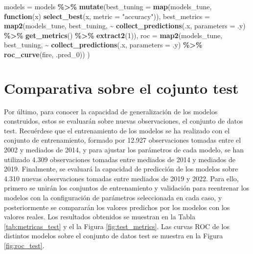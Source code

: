\documentclass[12pt,a4paper,]{book}
\newenvironment{Shaded}{\begin{snugshade}}{\end{snugshade}}
\newcommand{\AttributeTok}[1]{\textcolor[rgb]{0.13,0.29,0.53}{#1}}
\newcommand{\ControlFlowTok}[1]{\textcolor[rgb]{0.13,0.29,0.53}{\textbf{#1}}}
\newcommand{\DecValTok}[1]{\textcolor[rgb]{0.00,0.00,0.81}{#1}}
\newcommand{\FunctionTok}[1]{\textcolor[rgb]{0.13,0.29,0.53}{\textbf{#1}}}
\newcommand{\NormalTok}[1]{#1}
\newcommand{\OtherTok}[1]{\textcolor[rgb]{0.56,0.35,0.01}{#1}}
\newcommand{\SpecialCharTok}[1]{\textcolor[rgb]{0.81,0.36,0.00}{\textbf{#1}}}
\newcommand{\StringTok}[1]{\textcolor[rgb]{0.31,0.60,0.02}{#1}}
\numberwithin{dummy}{section}
\theoremstyle{ocrenumbox}
\theoremstyle{blacknumex}
\theoremstyle{blacknumbox}
\theoremstyle{ocrenum}
\theoremstyle{ocrenum}
\begin{document}
\begin{Shaded}
\begin{Highlighting}[]
\NormalTok{models }\OtherTok{=}\NormalTok{ models }\SpecialCharTok{\%\textgreater{}\%} 
  \FunctionTok{mutate}\NormalTok{(}\AttributeTok{best\_tuning =} \FunctionTok{map}\NormalTok{(models\_tune, }
                           \ControlFlowTok{function}\NormalTok{(x) }\FunctionTok{select\_best}\NormalTok{(x, }
                                                   \AttributeTok{metric =} \StringTok{"accuracy"}\NormalTok{)),}
         \AttributeTok{best\_metrics =} \FunctionTok{map2}\NormalTok{(models\_tune,}
\NormalTok{                             best\_tuning,       }
                             \SpecialCharTok{\textasciitilde{}} \FunctionTok{collect\_predictions}\NormalTok{(.x,}
                                                   \AttributeTok{parameters =}\NormalTok{ .y) }\SpecialCharTok{\%\textgreater{}\%}    
                               \FunctionTok{get\_metrics}\NormalTok{() }\SpecialCharTok{\%\textgreater{}\%}          
                               \FunctionTok{extract2}\NormalTok{(}\DecValTok{1}\NormalTok{)), }
         \AttributeTok{roc =} \FunctionTok{map2}\NormalTok{(models\_tune,}
\NormalTok{                    best\_tuning,}
                    \SpecialCharTok{\textasciitilde{}} \FunctionTok{collect\_predictions}\NormalTok{(.x,}
                                          \AttributeTok{parameters =}\NormalTok{ .y) }\SpecialCharTok{\%\textgreater{}\%}    
                      \FunctionTok{roc\_curve}\NormalTok{(fire, .pred\_0))}
\NormalTok{         ) }
\end{Highlighting}
\end{Shaded}

\hypertarget{comparativa-sobre-el-cojunto-test}{%
\section{Comparativa sobre el cojunto
test}\label{comparativa-sobre-el-cojunto-test}}

Por último, para conocer la capacidad de generalización de los modelos
construidos, estos se evaluarán sobre nuevas observaciones, el conjunto
de datos test. Recuérdese que el entrenamiento de los modelos se ha
realizado con el conjunto de entrenamiento, formado por 12.927
observaciones tomadas entre el 2002 y mediados de 2014, y para ajustar
los parámetros de cada modelo, se han utilizado 4.309 observaciones
tomadas entre mediados de 2014 y mediados de 2019. Finalmente, se
evaluará la capacidad de predicción de los modelos sobre 4.310 nuevas
observaciones tomadas entre mediados de 2019 y 2022. Para ello, primero
se unirán los conjuntos de entrenamiento y validación para reentrenar
los modelos con la configuración de parámetros seleccionada en cada
caso, y posteriormente se compararán los valores predichos por los
modelos con los valores reales. Los resultados obtenidos se muestran en
la Tabla \ref{tab:metricas_test} y el la Figura \ref{fig:test_metrics}.
Las curvas ROC de los distintos modelos sobre el conjunto de datos test
se muestra en la Figura \ref{fig:roc_test}.
\end{document}

